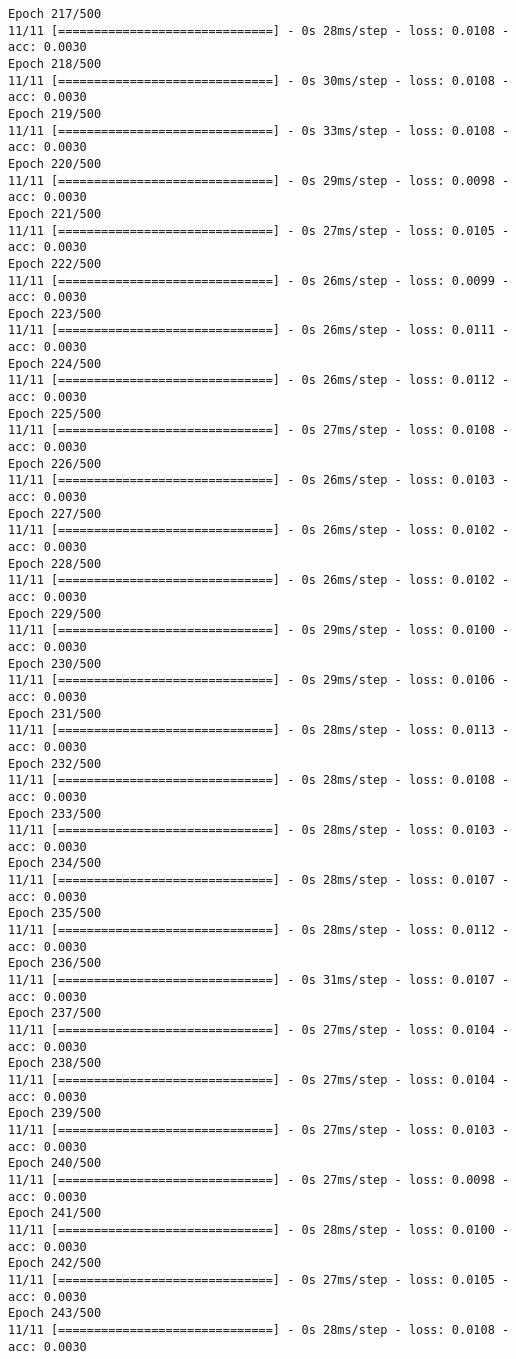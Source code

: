 \documentclass[11pt]{article}
\begin{document}
\begin{Verbatim}[commandchars=\\\{\}]
Epoch 217/500
11/11 [==============================] - 0s 28ms/step - loss: 0.0108 - acc: 0.0030
Epoch 218/500
11/11 [==============================] - 0s 30ms/step - loss: 0.0108 - acc: 0.0030
Epoch 219/500
11/11 [==============================] - 0s 33ms/step - loss: 0.0108 - acc: 0.0030
Epoch 220/500
11/11 [==============================] - 0s 29ms/step - loss: 0.0098 - acc: 0.0030
Epoch 221/500
11/11 [==============================] - 0s 27ms/step - loss: 0.0105 - acc: 0.0030
Epoch 222/500
11/11 [==============================] - 0s 26ms/step - loss: 0.0099 - acc: 0.0030
Epoch 223/500
11/11 [==============================] - 0s 26ms/step - loss: 0.0111 - acc: 0.0030
Epoch 224/500
11/11 [==============================] - 0s 26ms/step - loss: 0.0112 - acc: 0.0030
Epoch 225/500
11/11 [==============================] - 0s 27ms/step - loss: 0.0108 - acc: 0.0030
Epoch 226/500
11/11 [==============================] - 0s 26ms/step - loss: 0.0103 - acc: 0.0030
Epoch 227/500
11/11 [==============================] - 0s 26ms/step - loss: 0.0102 - acc: 0.0030
Epoch 228/500
11/11 [==============================] - 0s 26ms/step - loss: 0.0102 - acc: 0.0030
Epoch 229/500
11/11 [==============================] - 0s 29ms/step - loss: 0.0100 - acc: 0.0030
Epoch 230/500
11/11 [==============================] - 0s 29ms/step - loss: 0.0106 - acc: 0.0030
Epoch 231/500
11/11 [==============================] - 0s 28ms/step - loss: 0.0113 - acc: 0.0030
Epoch 232/500
11/11 [==============================] - 0s 28ms/step - loss: 0.0108 - acc: 0.0030
Epoch 233/500
11/11 [==============================] - 0s 28ms/step - loss: 0.0103 - acc: 0.0030
Epoch 234/500
11/11 [==============================] - 0s 28ms/step - loss: 0.0107 - acc: 0.0030
Epoch 235/500
11/11 [==============================] - 0s 28ms/step - loss: 0.0112 - acc: 0.0030
Epoch 236/500
11/11 [==============================] - 0s 31ms/step - loss: 0.0107 - acc: 0.0030
Epoch 237/500
11/11 [==============================] - 0s 27ms/step - loss: 0.0104 - acc: 0.0030
Epoch 238/500
11/11 [==============================] - 0s 27ms/step - loss: 0.0104 - acc: 0.0030
Epoch 239/500
11/11 [==============================] - 0s 27ms/step - loss: 0.0103 - acc: 0.0030
Epoch 240/500
11/11 [==============================] - 0s 27ms/step - loss: 0.0098 - acc: 0.0030
Epoch 241/500
11/11 [==============================] - 0s 28ms/step - loss: 0.0100 - acc: 0.0030
Epoch 242/500
11/11 [==============================] - 0s 27ms/step - loss: 0.0105 - acc: 0.0030
Epoch 243/500
11/11 [==============================] - 0s 28ms/step - loss: 0.0108 - acc: 0.0030

\end{Verbatim}
\end{document}
